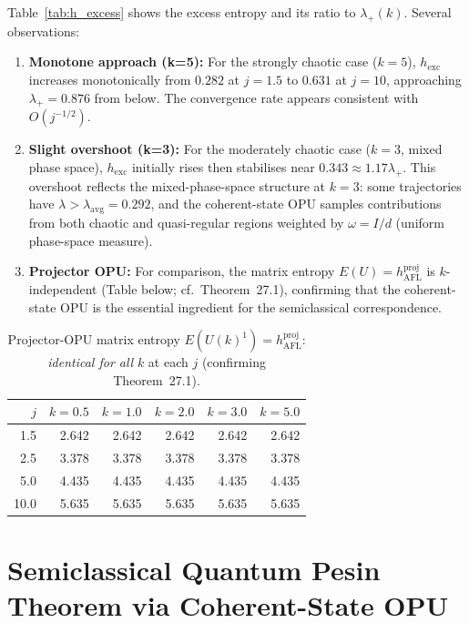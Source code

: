 \documentclass[12pt,a4paper]{article}
\begin{document}
Table~\ref{tab:h_excess} shows the excess entropy and its ratio to $\lambda_+(k)$.
Several observations:

\begin{enumerate}
  \item \textbf{Monotone approach (k=5):} For the strongly chaotic case
    ($k=5$), $h_{\mathrm{exc}}$ increases monotonically from $0.282$ at
    $j=1.5$ to $0.631$ at $j=10$, approaching $\lambda_+ = 0.876$ from below.
    The convergence rate appears consistent with $O(j^{-1/2})$.

  \item \textbf{Slight overshoot (k=3):} For the moderately chaotic case
    ($k=3$, mixed phase space), $h_{\mathrm{exc}}$ initially rises then
    stabilises near $0.343 \approx 1.17\lambda_+$.  This overshoot reflects
    the mixed-phase-space structure at $k=3$: some trajectories have
    $\lambda > \lambda_{\mathrm{avg}} = 0.292$, and the coherent-state OPU
    samples contributions from both chaotic and quasi-regular regions
    weighted by $\omega = I/d$ (uniform phase-space measure).

  \item \textbf{Projector OPU:} For comparison, the matrix entropy
    $E(U) = h_{\mathrm{AFL}}^{\mathrm{proj}}$ is $k$-independent (Table below;
    cf.\ Theorem~27.1), confirming that the coherent-state OPU is
    the essential ingredient for the semiclassical correspondence.
\end{enumerate}

\begin{table}[h!]
\centering
\caption{Projector-OPU matrix entropy $E(U(k)^1) = h_{\mathrm{AFL}}^{\mathrm{proj}}$:
\emph{identical for all} $k$ at each $j$ (confirming Theorem~27.1).}
\label{tab:proj_opu}
\begin{tabular}{r|rrrrr}
\hline
$j$ & $k=0.5$ & $k=1.0$ & $k=2.0$ & $k=3.0$ & $k=5.0$ \\
\hline
1.5  & 2.642 & 2.642 & 2.642 & 2.642 & 2.642 \\
2.5  & 3.378 & 3.378 & 3.378 & 3.378 & 3.378 \\
5.0  & 4.435 & 4.435 & 4.435 & 4.435 & 4.435 \\
10.0 & 5.635 & 5.635 & 5.635 & 5.635 & 5.635 \\
\hline
\end{tabular}
\end{table}

\section{Semiclassical Quantum Pesin Theorem via Coherent-State OPU}
\label{sec:semiclassical_pesin}
\end{document}
